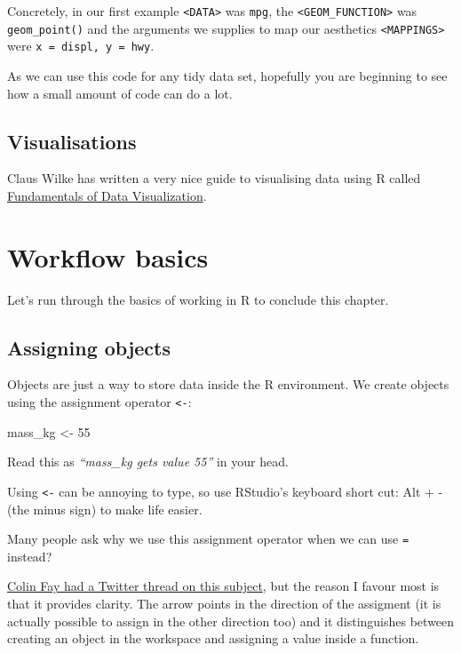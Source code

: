 \documentclass[12pt,]{book}
\newenvironment{Shaded}{\begin{snugshade}}{\end{snugshade}}
\newcommand{\DecValTok}[1]{\textcolor[rgb]{0.00,0.00,0.81}{#1}}
\newcommand{\NormalTok}[1]{#1}
\newcommand{\StringTok}[1]{\textcolor[rgb]{0.31,0.60,0.02}{#1}}
\begin{document}
Concretely, in our first example \texttt{\textless{}DATA\textgreater{}} was \texttt{mpg}, the \texttt{\textless{}GEOM\_FUNCTION\textgreater{}}
was \texttt{geom\_point()} and the arguments we supplies to map our aesthetics
\texttt{\textless{}MAPPINGS\textgreater{}} were \texttt{x\ =\ displ,\ y\ =\ hwy}.

As we can use this code for any tidy data set, hopefully you are beginning to
see how a small amount of code can do a lot.

\hypertarget{viz}{%
\subsection{Visualisations}\label{viz}}

Claus Wilke has written a very nice guide to visualising data using R called
\href{http://serialmentor.com/dataviz/index.html}{Fundamentals of Data Visualization}.

\hypertarget{workflow-basics}{%
\section{Workflow basics}\label{workflow-basics}}

Let's run through the basics of working in R to conclude this chapter.

\hypertarget{assigning-objects}{%
\subsection{Assigning objects}\label{assigning-objects}}

Objects are just a way to store data inside the R environment. We create objects using the assignment operator \texttt{\textless{}-}:

\begin{Shaded}
\begin{Highlighting}[]
\NormalTok{mass_kg <-}\StringTok{ }\DecValTok{55}
\end{Highlighting}
\end{Shaded}

Read this as \emph{``mass\_kg gets value 55''} in your head.

Using \texttt{\textless{}-} can be annoying to type, so use RStudio's keyboard short cut:
Alt + - (the minus sign) to make life easier.

Many people ask why we use this assignment operator when we can use \texttt{=} instead?

\href{https://twitter.com/_colinfay/status/1006139974377443328}{Colin Fay had a Twitter thread on this subject},
but the reason I favour most is that it provides clarity. The arrow points in
the direction of the assigment (it is actually possible to assign in the other
direction too) and it distinguishes between creating an object in the workspace
and assigning a value inside a function.
\end{document}
